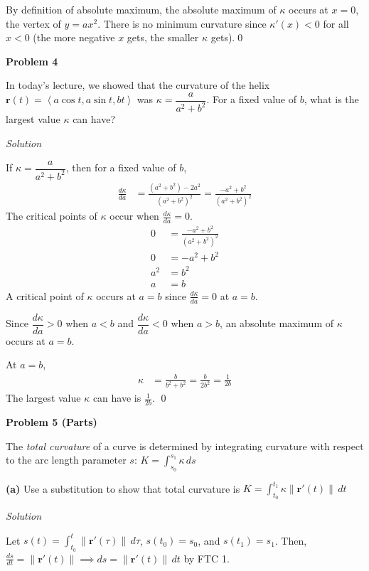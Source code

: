 \documentclass{article}
\newcommand{\lra}[1]{\left\langle #1 \right\rangle}
\renewcommand{\r}[0]{\mathbf{r}}
\newcommand{\Solution}{\textit{Solution}}
\begin{document}
By definition of absolute maximum, the absolute maximum of $\kappa$ occurs at $x=0$, the vertex of $y=ax^2$. There is no minimum curvature since $\kappa'(x)<0$ for all $x<0$ (the more negative $x$ gets, the smaller $\kappa$ gets).\qed

{}\textbf{Problem 4}

In today's lecture, we showed that the curvature of the helix $\r(t)=\lra{a\cos t,a\sin t, bt}$ was $\kappa=\dfrac{a}{a^2+b^2}$. For a fixed value of $b$, what is the largest value $\kappa$ can have?

\Solution

If $\kappa=\dfrac{a}{a^2+b^2}$, then for a fixed value of $b$,
\begin{align*}
    \frac{d\kappa}{da}&=\frac{(a^2+b^2)-2a^2}{(a^2+b^2)^2}=\frac{-a^2+b^2}{(a^2+b^2)^2}
\end{align*}
The critical points of $\kappa$ occur when $\displaystyle  \frac{d\kappa}{da}=0$.
\begin{align*}
    0&=\frac{-a^2+b^2}{(a^2+b^2)^2}\\
    0&=-a^2+b^2\\
    a^2&=b^2\\
    a&=b\tag{$a,b\geq0$ since they're both radii}
\end{align*}
A critical point of $\kappa$ occurs at $a=b$ since $\displaystyle  \frac{d\kappa}{da}=0$ at $a=b$.

Since $\dfrac{d\kappa}{da}>0$ when $a<b$ and $\dfrac{d\kappa}{da}<0$ when $a>b$, an absolute maximum of $\kappa$ occurs at $a=b$.

At $a=b$,
\begin{align*}
    \kappa&=\frac{b}{b^2+b^2}=\frac{b}{2b^2}={\frac{1}{2b}}
\end{align*}
The largest value $\kappa$ can have is $\displaystyle\frac{1}{2b}$.
\qed
\newpage
{}
{}\textbf{Problem 5 (Parts)}

The \textit{total curvature} of a curve is determined by integrating curvature with respect to the arc length parameter $s$: $\displaystyle K=\int_{s_0}^{s_1} \kappa\,ds$

{} \textbf{(a)} Use a substitution to show that total curvature is $\displaystyle K=\int_{t_0}^{t_1} \kappa \lVert \r'(t)\rVert\,dt$

\Solution

Let $\displaystyle s(t)=\int_{t_0}^t \lVert \r'(\tau)\rVert\,d\tau$, $s(t_0)=s_0$, and $s(t_1)=s_1$. Then, $\displaystyle \frac{ds}{dt}=\lVert \r'(t)\rVert\implies ds=\lVert \r'(t)\rVert\,dt$ by FTC 1. 
\end{document}
